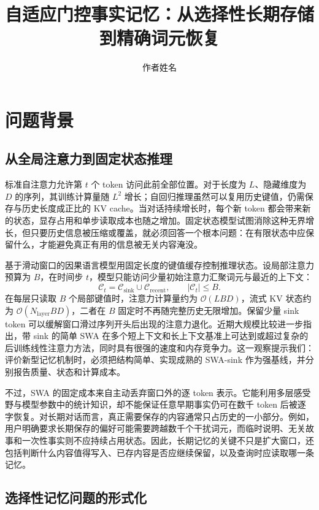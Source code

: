 \documentclass[letterpaper]{article}
\title{自适应门控事实记忆：从选择性长期存储到精确词元恢复}
\author{作者姓名}
\begin{document}
\maketitle

\section{问题背景}

\subsection{从全局注意力到固定状态推理}

标准自注意力允许第 $t$ 个 token 访问此前全部位置。对于长度为 $L$、隐藏维度为 $D$ 的序列，其训练计算量随 $L^2$ 增长；自回归推理虽然可以复用历史键值，仍需保存与历史长度成正比的 KV cache\cite{vaswani2017attention}。当对话持续增长时，每个新 token 都会带来新的状态，显存占用和单步读取成本也随之增加。固定状态模型试图消除这种无界增长，但只要历史信息被压缩或覆盖，就必须回答一个根本问题：在有限状态中应保留什么，才能避免真正有用的信息被无关内容淹没。

基于滑动窗口的因果语言模型用固定长度的键值缓存控制推理状态。设局部注意力预算为 $B$，在时间步 $t$，模型只能访问少量初始注意力汇聚词元与最近的上下文：
\begin{equation}
\mathcal{C}_t=\mathcal{C}_{\mathrm{sink}}\cup
\mathcal{C}_{\mathrm{recent}},\qquad
|\mathcal{C}_t|\leq B.
\end{equation}
在每层只读取 $B$ 个局部键值时，注意力计算量约为 $\mathcal{O}(LBD)$，流式 KV 状态约为 $\mathcal{O}(N_{\mathrm{layer}}BD)$，二者在 $B$ 固定时不再随完整历史无限增加。保留少量 sink token 可以缓解窗口滑过序列开头后出现的注意力退化\cite{xiao2024streamingllm}。近期大规模比较进一步指出，带 sink 的简单 SWA 在多个短上下文和长上下文基准上可达到或超过复杂的后训练线性注意力方法，同时具有很强的速度和内存竞争力\cite{jolicoeur2026sliding}。这一观察提示我们：评价新型记忆机制时，必须把结构简单、实现成熟的 SWA-sink 作为强基线，并分别报告质量、状态和计算成本。

不过，SWA 的固定成本来自主动丢弃窗口外的逐 token 表示。它能利用多层感受野与模型参数中的统计知识，却不能保证任意早期事实仍可在数千 token 后被逐字恢复。对长期对话而言，真正需要保存的内容通常只占历史的一小部分。例如，用户明确要求长期保存的偏好可能需要跨越数千个干扰词元，而临时说明、无关故事和一次性事实则不应持续占用状态。因此，长期记忆的关键不只是扩大窗口，还包括判断什么内容值得写入、已存内容是否应继续保留，以及查询时应读取哪一条记忆。

\subsection{选择性记忆问题的形式化}
\end{document}

